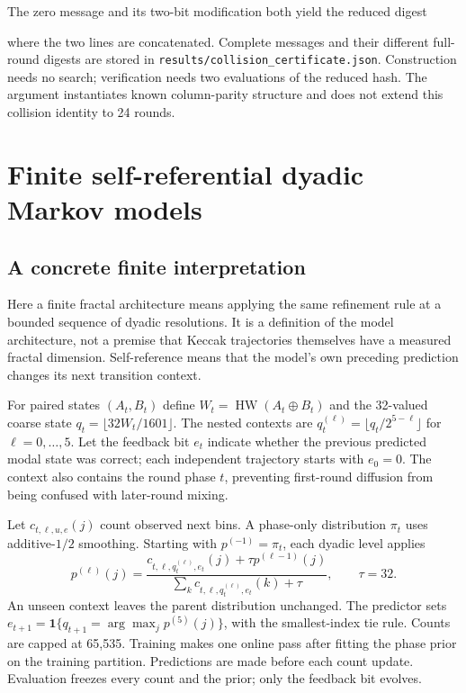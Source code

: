 \documentclass[11pt]{article}
\newcommand{\HW}{\operatorname{HW}}
\begin{document}
The zero message and its two-bit modification both yield the reduced digest
\begin{center}\small\ttfamily
\CollisionDigest
\end{center}
where the two lines are concatenated. Complete messages and their different full-round digests are stored in \texttt{results/collision\_certificate.json}. Construction needs no search; verification needs two evaluations of the reduced hash. The argument instantiates known column-parity structure and does not extend this collision identity to 24 rounds.

\section{Finite self-referential dyadic Markov models}

\subsection{A concrete finite interpretation}

Here a finite fractal architecture means applying the same refinement rule at a bounded sequence of dyadic resolutions. It is a definition of the model architecture, not a premise that Keccak trajectories themselves have a measured fractal dimension. Self-reference means that the model's own preceding prediction changes its next transition context.

For paired states $(A_t,B_t)$ define $W_t=\HW(A_t\oplus B_t)$ and the 32-valued coarse state $q_t=\lfloor32W_t/1601\rfloor$. The nested contexts are $q_t^{(\ell)}=\lfloor q_t/2^{5-\ell}\rfloor$ for $\ell=0,\ldots,5$. Let the feedback bit $e_t$ indicate whether the previous predicted modal state was correct; each independent trajectory starts with $e_0=0$. The context also contains the round phase $t$, preventing first-round diffusion from being confused with later-round mixing.

Let $c_{t,\ell,u,e}(j)$ count observed next bins. A phase-only distribution $\pi_t$ uses additive-$1/2$ smoothing. Starting with $p^{(-1)}=\pi_t$, each dyadic level applies
\begin{equation}
p^{(\ell)}(j)=\frac{c_{t,\ell,q_t^{(\ell)},e_t}(j)+\tau p^{(\ell-1)}(j)}
{\sum_k c_{t,\ell,q_t^{(\ell)},e_t}(k)+\tau},
\qquad\tau=32.
\label{eq:meta}
\end{equation}
An unseen context leaves the parent distribution unchanged. The predictor sets $e_{t+1}=\mathbf1\{q_{t+1}=\arg\max_jp^{(5)}(j)\}$, with the smallest-index tie rule. Counts are capped at 65,535. Training makes one online pass after fitting the phase prior on the training partition. Predictions are made before each count update. Evaluation freezes every count and the prior; only the feedback bit evolves.
\end{document}
